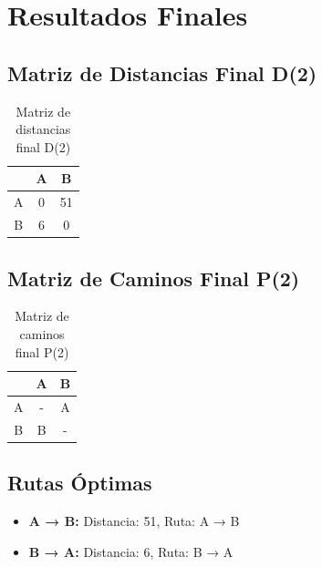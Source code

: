 \documentclass[12pt]{article}
\begin{document}
\clearpage
\section{Resultados Finales}
\subsection{Matriz de Distancias Final D(2)}
\begin{table}[h!]
\centering
\begin{tabular}{|c|c|c|}
\hline
 & A & B \\\hline
A & 0 & 51 \\\hline
B & 6 & 0 \\\hline
\end{tabular}
\caption{Matriz de distancias final D(2)}
\end{table}

\clearpage
\subsection{Matriz de Caminos Final P(2)}
\begin{table}[h!]
\centering
\begin{tabular}{|c|c|c|}
\hline
 & A & B \\\hline
A & - & A \\\hline
B & B & - \\\hline
\end{tabular}
\caption{Matriz de caminos final P(2)}
\end{table}

\clearpage
\subsection{Rutas Óptimas}
\begin{itemize}
\item \textbf{A → B:} Distancia: 51, Ruta: A → B
\item \textbf{B → A:} Distancia: 6, Ruta: B → A
\end{itemize}
\end{document}
